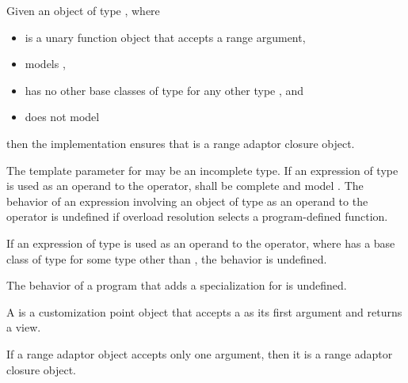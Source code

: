 \pnum
Given an object  of type , where
\begin{itemize}
\item
{} is a unary function object that accepts a range argument,
\item
{} models ,
\item
{} has no other base classes of type  for any other type , and
\item
{} does not model 
\end{itemize}
then the implementation ensures
that  is a range adaptor closure object.

\pnum
The template parameter  for 
may be an incomplete type.
If an expression of type \cv{} 
is used as an operand to the \tcode{|} operator,
 shall be complete and
model .
The behavior of an expression involving an object of type \cv{} 
as an operand to the \tcode{|} operator is undefined
if overload resolution selects a program-defined  function.

\pnum
If an expression of type \cv{} 
is used as an operand to the \tcode{|} operator,
where  has a base class of type 
for some type  other than , the behavior is undefined.

\pnum
The behavior of a program
that adds a specialization for  is undefined.

\pnum
A  is a
customization point object
that accepts a  as its first argument and returns a view.

\pnum
If a range adaptor object accepts only one argument,
then it is a range adaptor closure object.

